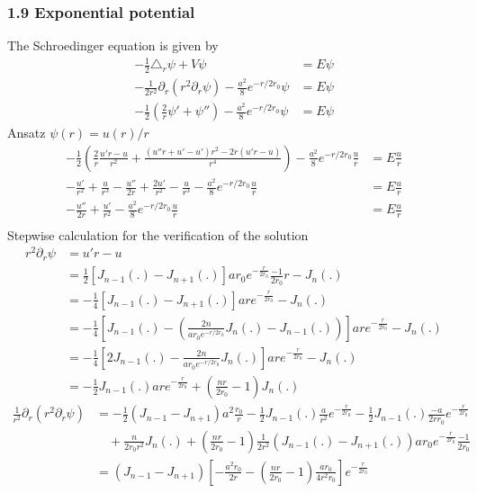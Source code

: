 \documentclass[10pt,a4paper]{article}
\theoremstyle{definition}
\begin{document}
\subsubsection{1.9 Exponential potential}
The Schroedinger equation is given by
\begin{align}
-\frac{1}{2}\triangle_r\psi+V\psi&=E\psi\\
-\frac{1}{2r^2}\partial_r(r^2\partial_r \psi)-\frac{a^2}{8}e^{-r/2r_0}\psi&=E\psi\\
-\frac{1}{2}\left(\frac{2}{r}\psi'+\psi''\right)-\frac{a^2}{8}e^{-r/2r_0}\psi&=E\psi
\end{align}
Ansatz $\psi(r)=u(r)/r$
\begin{align}
-\frac{1}{2}\left(\frac{2}{r}\frac{u'r-u}{r^2}+\frac{(u''r+u'-u')r^2-2r(u'r-u)}{r^4}\right)-\frac{a^2}{8}e^{-r/2r_0}\frac{u}{r}&=E\frac{u}{r}\\
-\frac{u'}{r^2}+\frac{u}{r^3}-\frac{u''}{2r}+\frac{2u'}{r^2}-\frac{u}{r^3}-\frac{a^2}{8}e^{-r/2r_0}\frac{u}{r}&=E\frac{u}{r}\\
-\frac{u''}{2r}+\frac{u'}{r^2}-\frac{a^2}{8}e^{-r/2r_0}\frac{u}{r}&=E\frac{u}{r}\\
\end{align}
Stepwise calculation for the verification of the solution
\begin{align}
r^2\partial_r \psi
&=u'r-u\\
&=\frac{1}{2}\left[J_{n-1}(.)-J_{n+1}(.)\right]ar_0e^{-\frac{r}{2r_0}}\frac{-1}{2r_0}r-J_n(.)\\
&=-\frac{1}{4}\left[J_{n-1}(.)-J_{n+1}(.)\right]are^{-\frac{r}{2r_0}}-J_n(.)\\
&=-\frac{1}{4}\left[J_{n-1}(.)-\left(\frac{2n}{ar_0e^{-r/2r_0}}J_n(.)-J_{n-1}(.)\right)\right]are^{-\frac{r}{2r_0}}-J_n(.)\\
&=-\frac{1}{4}\left[2J_{n-1}(.)-\frac{2n}{ar_0e^{-r/2r_0}}J_n(.)\right]are^{-\frac{r}{2r_0}}-J_n(.)\\
&=-\frac{1}{2}J_{n-1}(.)are^{-\frac{r}{2r_0}}+\left(\frac{nr}{2r_0}-1\right)J_n(.)
\end{align}
\begin{align}
\frac{1}{r^2}\partial_r(r^2\partial_r \psi)
&=-\frac{1}{2}\left(J_{n-1}-J_{n+1}\right)a^2\frac{r_0}{r}-\frac{1}{2}J_{n-1}(.)\frac{a}{r^2}e^{-\frac{r}{2r_0}}-\frac{1}{2}J_{n-1}(.)\frac{-a}{2rr_0}e^{-\frac{r}{2r_0}}\\
&\quad+\frac{n}{2r_0r^2}J_n(.)+\left(\frac{nr}{2r_0}-1\right)\frac{1}{2r^2}(J_{n-1}(.)-J_{n+1}(.))ar_0e^{-\frac{r}{2r_0}}\frac{-1}{2r_0}\\
&=\left(J_{n-1}-J_{n+1}\right)\left[-\frac{a^2r_0}{2r}-\left(\frac{nr}{2r_0}-1\right)\frac{ar_0}{4r^2r_0}\right]e^{-\frac{r}{2r_0}}
\end{align}
\end{document}
